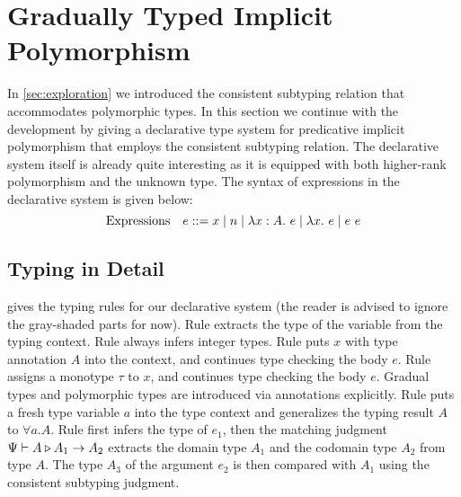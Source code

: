 \section{Gradually Typed Implicit Polymorphism}
\label{sec:type-system}

In \cref{sec:exploration} we introduced the consistent
subtyping relation that accommodates polymorphic types. In
this section we continue with the development by giving a declarative
type system for predicative implicit polymorphism that employs the consistent
subtyping relation. The declarative system itself is already quite
interesting as it is equipped with both higher-rank polymorphism and
the unknown type.
The syntax of expressions in the declarative system is given below:
\[
  \text{Expressions}\quad e ::= x \mid n \mid \lambda x:A.~ e \mid \lambda {x}.~ e \mid e~e
\]


\subsection{Typing in Detail}

 gives the typing rules for our declarative system
(the reader is advised to ignore the gray-shaded parts for now). Rule 
extracts the type of the variable from the typing context. Rule  always
infers integer types. Rule  puts $x$ with type annotation $A$ into
the context, and continues type checking the body $e$. Rule  assigns a
monotype $\tau$ to $x$, and continues type checking the body $e$. Gradual types
and polymorphic types are introduced via annotations explicitly.
Rule  puts a fresh type variable $a$ into the type context and generalizes
the typing result $A$ to $\forall a. A$.
Rule  first
infers the type of $e_1$, then the matching judgment $\Psi {} \vdash A \triangleright A_1
\to A_2$ extracts the domain type $A_1$ and the codomain type $A_2$ from type
$A$. The type $A_3$ of the argument $e_2$ is then compared with $A_1$ using the
consistent subtyping judgment.

